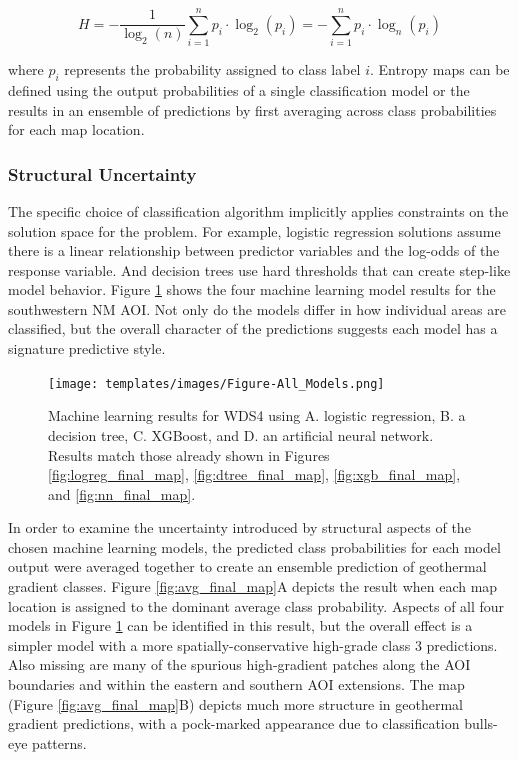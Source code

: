 \begin{equation}
\label{eq:norm_entropy}
    H = -\frac{1}{\log_2{(n)}}\sum_{i=1}^{n}{p_i \cdot \log_2{(p_i)}} = -\sum_{i=1}^{n}{p_i \cdot \log_n{(p_i)}}
\end{equation}

where $p_i$ represents the probability assigned to class label $i$. Entropy maps can be defined using the output probabilities of a single classification model or the results in an ensemble of predictions by first averaging across class probabilities for each map location.

\subsubsection{Structural Uncertainty}

The specific choice of classification algorithm implicitly applies constraints on the solution space for the problem. For example, logistic regression solutions assume there is a linear relationship between predictor variables and the log-odds of the response variable. And decision trees use hard thresholds that can create step-like model behavior. Figure \ref{fig:combined_maps} shows the four machine learning model results for the southwestern NM AOI. Not only do the models differ in how individual areas are classified, but the overall character of the predictions suggests each model has a signature predictive style.

\begin{figure}[!htp]
\centering
\texttt{[image: templates/images/Figure-All\_Models.png]}
\caption[Combined machine learning results]{Machine learning results for WDS4 using A. logistic regression, B. a decision tree, C. XGBoost, and D. an artificial neural network. Results match those already shown in Figures \ref{fig:logreg_final_map}, \ref{fig:dtree_final_map}, \ref{fig:xgb_final_map}, and \ref{fig:nn_final_map}.}
\label{fig:combined_maps}
\end{figure}

In order to examine the uncertainty introduced by structural aspects of the chosen machine learning models, the predicted class probabilities for each model output were averaged together to create an ensemble prediction of geothermal gradient classes. Figure \ref{fig:avg_final_map}A depicts the result when each map location is assigned to the dominant average class probability. Aspects of all four models in Figure \ref{fig:combined_maps} can be identified in this result, but the overall effect is a simpler model with a more spatially-conservative high-grade class 3 predictions. Also missing are many of the spurious high-gradient patches along the AOI boundaries and within the eastern and southern AOI extensions. The \citeauthor{bielicki_hydrogeolgic_2015} map (Figure \ref{fig:avg_final_map}B) depicts much more structure in geothermal gradient predictions, with a pock-marked appearance due to classification bulls-eye patterns.

